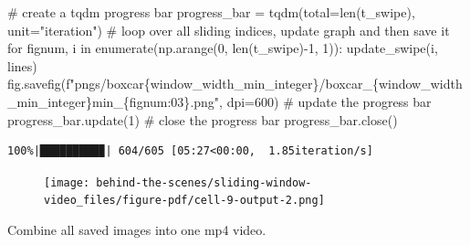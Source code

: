 \documentclass[
  letterpaper,
  DIV=11,
  numbers=noendperiod,
  oneside]{scrreprt}
\newenvironment{Shaded}{\begin{snugshade}}{\end{snugshade}}
\newcommand{\BuiltInTok}[1]{\textcolor[rgb]{0.00,0.23,0.31}{#1}}
\newcommand{\CommentTok}[1]{\textcolor[rgb]{0.37,0.37,0.37}{#1}}
\newcommand{\ControlFlowTok}[1]{\textcolor[rgb]{0.00,0.23,0.31}{#1}}
\newcommand{\DecValTok}[1]{\textcolor[rgb]{0.68,0.00,0.00}{#1}}
\newcommand{\KeywordTok}[1]{\textcolor[rgb]{0.00,0.23,0.31}{#1}}
\newcommand{\NormalTok}[1]{\textcolor[rgb]{0.00,0.23,0.31}{#1}}
\newcommand{\OperatorTok}[1]{\textcolor[rgb]{0.37,0.37,0.37}{#1}}
\newcommand{\SpecialCharTok}[1]{\textcolor[rgb]{0.37,0.37,0.37}{#1}}
\newcommand{\SpecialStringTok}[1]{\textcolor[rgb]{0.13,0.47,0.30}{#1}}
\newcommand{\StringTok}[1]{\textcolor[rgb]{0.13,0.47,0.30}{#1}}
\begin{document}
\begin{Shaded}
\begin{Highlighting}[]
\CommentTok{\# create a tqdm progress bar}
\NormalTok{progress\_bar }\OperatorTok{=}\NormalTok{ tqdm(total}\OperatorTok{=}\BuiltInTok{len}\NormalTok{(t\_swipe), unit}\OperatorTok{=}\StringTok{"iteration"}\NormalTok{)}
\CommentTok{\# loop over all sliding indices, update graph and then save it}
\ControlFlowTok{for}\NormalTok{ fignum, i }\KeywordTok{in} \BuiltInTok{enumerate}\NormalTok{(np.arange(}\DecValTok{0}\NormalTok{, }\BuiltInTok{len}\NormalTok{(t\_swipe)}\OperatorTok{{-}}\DecValTok{1}\NormalTok{, }\DecValTok{1}\NormalTok{)):}
\NormalTok{    update\_swipe(i, lines)}
\NormalTok{    fig.savefig(}\SpecialStringTok{f"pngs/boxcar}\SpecialCharTok{\{}\NormalTok{window\_width\_min\_integer}\SpecialCharTok{\}}\SpecialStringTok{/boxcar\_}\SpecialCharTok{\{}\NormalTok{window\_width\_min\_integer}\SpecialCharTok{\}}\SpecialStringTok{min\_}\SpecialCharTok{\{}\NormalTok{fignum}\SpecialCharTok{:03\}}\SpecialStringTok{.png"}\NormalTok{, dpi}\OperatorTok{=}\DecValTok{600}\NormalTok{)}
    \CommentTok{\# update the progress bar}
\NormalTok{    progress\_bar.update(}\DecValTok{1}\NormalTok{)}
\CommentTok{\# close the progress bar}
\NormalTok{progress\_bar.close()}
\end{Highlighting}
\end{Shaded}

\begin{verbatim}
100%|█████████▉| 604/605 [05:27<00:00,  1.85iteration/s]
\end{verbatim}

\begin{figure}[H]

{\centering \texttt{[image: behind-the-scenes/sliding-window-video\_files/figure-pdf/cell-9-output-2.png]}

}

\end{figure}

Combine all saved images into one mp4 video.
\end{document}
